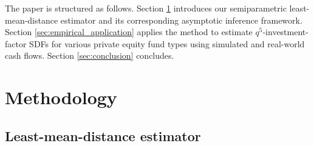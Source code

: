 \documentclass[12pt]{article}
\begin{document}
The paper is structured as follows. 
Section \ref{sec:Methodology} introduces our semiparametric least-mean-distance estimator and its corresponding asymptotic inference framework.
Section \ref{sec:empirical_application} applies the method to estimate $q^5$-investment-factor SDFs for various private equity fund types using simulated and real-world cash flows.
Section \ref{sec:conclusion} concludes.


\section{Methodology}
\label{sec:Methodology}

\subsection{Least-mean-distance estimator}
\label{sec:fundwise_lmd_estimator}
\end{document}
